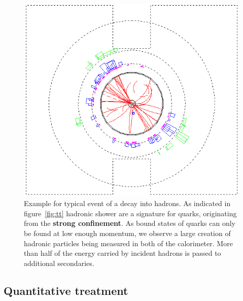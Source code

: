 \begin{figure}[htpb]
    \centering
    \includegraphics[width=0.8\linewidth]{figures/qq_02.png}
    \caption{Example for typical event of a decay into hadrons. As indicated in figure~\ref{fig:tt} hadronic shower are 
        a signature for quarks, originating from the \textbf{strong confinement}. 
        As bound states of quarks can only be found at low enough
   momentum, we observe a large creation of hadronic particles being measured in both of the calorimeter. More than half of
   the energy carried by incident hadrons is passed to additional secondaries. }
\label{fig:qq}
\end{figure}
\clearpage
\newpage
\subsection{Quantitative treatment}


